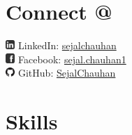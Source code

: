 \documentclass[letterpaper]{deedy-resume} %
\begin{document}




\begin{minipage}[t]{0.23\textwidth} %


\section{Connect @}
\footnotesize{
\includegraphics[height=10pt]{Linkedin-256.png} LinkedIn:  \href{https://www.linkedin.com/in/sejalchauhan}{sejalchauhan} \\
\includegraphics[height=10pt]{Facebook-256.png} Facebook:  \href{https://www.facebook.com/sejal.chauhan1}{sejal.chauhan1} \\
\includegraphics[height=10pt]{GitHub-Mark-32px.png} GitHub:  \href{https://github.com/SejalChauhan}{SejalChauhan} \\
}


\section{Skills}

\end{minipage}
\end{document}

